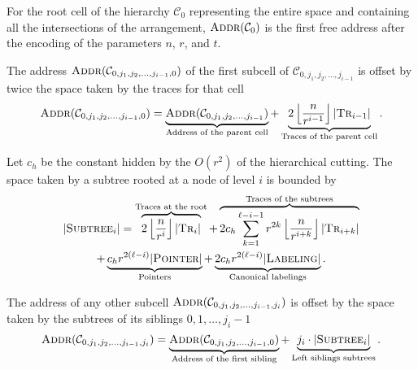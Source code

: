 
For the root cell of the hierarchy
\(\mathcal{C}_0\) representing the entire space and containing all the
intersections of the arrangement, \(\textsc{Addr}(\mathcal{C}_0)\) is the
first free address after the encoding of the parameters \(n\), \(r\), and \(t\).

The address \(\textsc{Addr}(\mathcal{C}_{0,j_1,j_2, \ldots, j_{i-1}, 0})\)
of the first subcell of \(\mathcal{C}_{0,j_1,j_2, \ldots, j_{i-1}}\)
is offset by twice the space taken by the traces for that cell
%
\begin{displaymath}
  \textsc{Addr}(\mathcal{C}_{0,j_1,j_2, \ldots, j_{i-1}, 0})
  =
  \underbrace{\textsc{Addr}(\mathcal{C}_{0,j_1,j_2, \ldots, j_{i-1}})}_{\text{Address of the parent cell}}
  +
  \underbrace{2 \left\lfloor \frac{n}{r^{i-1}} \right\rfloor |\textsc{Tr}_{i-1}|}_{\text{Traces of the parent cell}}
  .
\end{displaymath}

Let \(c_h\) be the constant hidden by the \(O(r^2)\) of the hierarchical cutting.
%
The space taken by a subtree rooted at a node of level \(i\) is bounded by
\begin{multline*}
  | \textsc{Subtree}_i |
  =
  \overbrace{2 \left\lfloor \frac{n}{r^{i}} \right\rfloor |\textsc{Tr}_{i}|}^{\text{Traces at the root}}
  +
  \overbrace{2c_h \sum_{k=1}^{\ell-i-1} r^{2k} \left\lfloor \frac{n}{r^{i+k}}
  \right\rfloor |\textsc{Tr}_{i+k}|}^{\text{Traces of the subtrees}}\\
  +
  \underbrace{c_h r^{2(\ell-i)} | \textsc{Pointer} |}_{\text{Pointers}}
  +
  \underbrace{2c_h r^{2(\ell-i)} | \textsc{Labeling} |}_{\text{Canonical labelings}}.
\end{multline*}

The address of any other subcell
\(\textsc{Addr}(\mathcal{C}_{0,j_1,j_2, \ldots, j_{i-1}, j_{i}})\)
is offset by the space taken by the subtrees of its siblings \(0, 1, \ldots,
j_{i} - 1\)
%
\begin{displaymath}
  \textsc{Addr}(\mathcal{C}_{0,j_1,j_2, \ldots, j_{i-1}, j_{i}})
  =
  \underbrace{\textsc{Addr}(\mathcal{C}_{0,j_1,j_2, \ldots, j_{i-1}, 0})}_{\text{Address of the first sibling}}
  +
  \underbrace{j_{i} \cdot | \textsc{Subtree}_{i} |}_{\text{Left siblings subtrees}}
  .
\end{displaymath}

